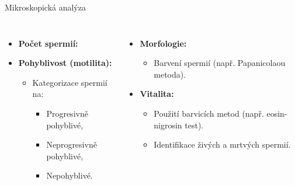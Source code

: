 \documentclass[aspectratio=169]{beamer}
\begin{document}
\begin{frame}{Mikroskopická analýza}    
    \begin{columns}
        \begin{itemize}
            \item \textbf{Počet spermií:}
            \begin{itemize}
            \end{itemize}
        
            \item \textbf{Pohyblivost (motilita):}
            \begin{itemize}
                \item Kategorizace spermií na:
                \begin{itemize}
                    \item Progresivně pohyblivé,
                    \item Neprogresivně pohyblivé,
                    \item Nepohyblivé.
                \end{itemize}
            \end{itemize}
        \end{itemize}
        
        \begin{itemize}
            \item \textbf{Morfologie:}
            \begin{itemize}
                \item Barvení spermií (např. Papanicolaou metoda).
            \end{itemize}
        
            \item \textbf{Vitalita:}
            \begin{itemize}
                \item Použití barvicích metod (např. eosin-nigrosin test).
                \item Identifikace živých a mrtvých spermií.
            \end{itemize}
        \end{itemize}
    \end{columns}
\end{frame}
\end{document}
